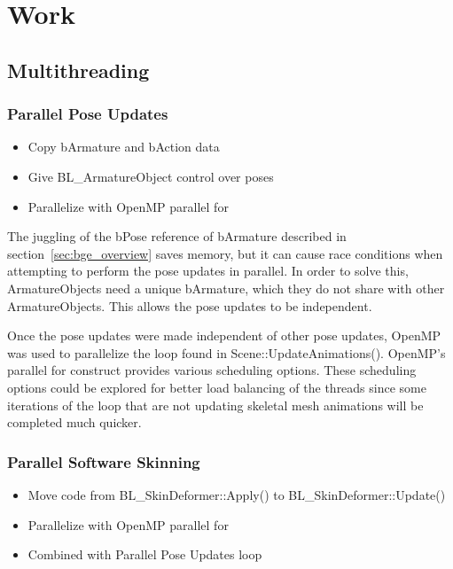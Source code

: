 \section{Work}
\subsection{Multithreading}
\subsubsection{Parallel Pose Updates}
\ifsummaries
\begin{itemize}
 \item Copy bArmature and bAction data
 \item Give BL\_ArmatureObject control over poses
 \item Parallelize with OpenMP parallel for
\end{itemize}
\fi


The juggling of the bPose reference of bArmature described in section~\ref{sec:bge_overview} saves memory, but it can cause race conditions when attempting to perform the pose updates in parallel. In order to solve this, ArmatureObjects need a unique bArmature, which they do not share with other ArmatureObjects. This allows the pose updates to be independent.

Once the pose updates were made independent of other pose updates, OpenMP\cite{openmp} was used to parallelize the loop found in Scene::UpdateAnimations(). OpenMP's parallel for construct provides various scheduling options. These scheduling options could be explored for better load balancing of the threads since some iterations of the loop that are not updating skeletal mesh animations will be completed much quicker.



\subsubsection{Parallel Software Skinning}
\ifsummaries
\begin{itemize}
 \item Move code from BL\_SkinDeformer::Apply() to BL\_SkinDeformer::Update()
 \item Parallelize with OpenMP parallel for
 \item Combined with Parallel Pose Updates loop
\end{itemize}
\fi

